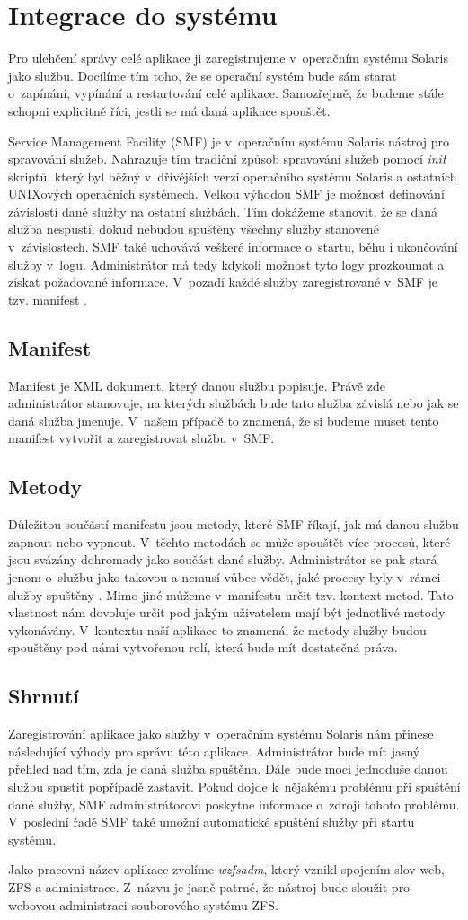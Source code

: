 \section{Integrace do systému}
Pro ulehčení správy celé aplikace ji zaregistrujeme v~operačním systému Solaris jako službu. Docílíme tím toho, že se operační systém bude sám starat o~zapínání, vypínání a restartování celé aplikace. Samozřejmě, že budeme stále schopni explicitně říci, jestli se má daná aplikace spouštět.

Service Management Facility (SMF) je v~operačním systému Solaris nástroj pro spravování služeb. Nahrazuje tím tradiční způsob spravování služeb pomocí \emph{init} skriptů, který byl běžný v~dřívějších verzí operačního systému Solaris a ostatních UNIXových operačních systémech. Velkou výhodou SMF je možnost definování závislostí dané služby na ostatní službách. Tím dokážeme stanovit, že se daná služba nespustí, dokud nebudou spuštěny všechny služby stanovené v~závislostech. SMF také uchovává veškeré informace o~startu, běhu i ukončování služby v~logu. Administrátor má tedy kdykoli možnost tyto logy prozkoumat a získat požadované informace. V~pozadí každé služby zaregistrované v~SMF je tzv. manifest \cite{SMF}.
    \subsection{Manifest}
    Manifest je XML dokument, který danou službu popisuje. Právě zde administrátor stanovuje, na kterých službách bude tato služba závislá nebo jak se daná služba jmenuje. V~našem případě to znamená, že si budeme muset tento manifest vytvořit a zaregistrovat službu v~SMF.
    \subsection{Metody}
    Důležitou součástí manifestu jsou metody, které SMF říkají, jak má danou službu zapnout nebo vypnout. V~těchto metodách se může spouštět více procesů, které jsou svázány dohromady jako součást dané služby. Administrátor se pak stará jenom o~službu jako takovou a nemusí vůbec vědět, jaké procesy byly v~rámci služby spuštěny \cite{SMF}. Mimo jiné můžeme v~manifestu určit tzv. kontext metod. Tato vlastnost nám dovoluje určit pod jakým uživatelem mají být jednotlivé metody vykonávány. V~kontextu naší aplikace to znamená, že metody služby budou spouštěny pod námi vytvořenou rolí, která bude mít dostatečná práva.
    \subsection{Shrnutí}
    Zaregistrování aplikace jako služby v~operačním systému Solaris nám přinese následující výhody pro správu této aplikace. Administrátor bude mít jasný přehled nad tím, zda je daná služba spuštěna. Dále bude moci jednoduše danou službu spustit popřípadě zastavit. Pokud dojde k~nějakému problému při spuštění dané služby, SMF administrátorovi poskytne informace o~zdroji tohoto problému. V~poslední řadě SMF také umožní automatické spuštění služby při startu systému.

    Jako pracovní název aplikace zvolíme \emph{wzfsadm}, který vznikl spojením slov web, ZFS a administrace. Z~názvu je jasně patrné, že nástroj bude sloužit pro webovou administraci souborového systému ZFS.



